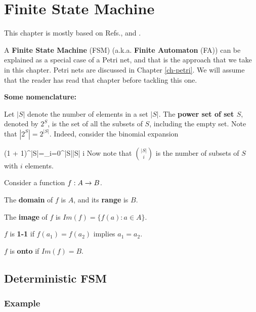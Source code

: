 \chapter{Finite State Machine}
\label{ch-finite-state}

This chapter is mostly based on Refs.\cite{fsm-brilliant}, \cite{wiki-det-automaton} and
\cite{wiki-nondet-automaton}.

A {\bf Finite State Machine} (FSM) (a.k.a. {\bf Finite Automaton} (FA))  can be explained as a 
special case of a Petri net, and that
is the approach that we take in this chapter.
Petri nets are discussed in Chapter \ref{ch-petri}. We will assume
that the reader has read that chapter before tackling this one.

{\bf Some nomenclature:}

Let $|S|$ denote the number of elements
in a set $|S|$.
The {\bf power set of set $S$}, denoted by $2^S$,
is the set of all the subsets of $S$, including the empty set.
Note that $|2^S|=2^{|S|}$. Indeed,
consider the binomial expansion

\beq
(1 + 1)^{|S|}=\sum_{i=0}^{|S|}{|S| \choose i}
\eeq
Now note that  ${|S|\choose i}$
is the number of subsets of $S$ with $i$ elements.

Consider a function
$f:A\rightarrow B$. 

The {\bf domain} of $f$ is $A$,
and its {\bf range} is $B$.

The {\bf image} of $f$
is $Im(f)=\{f(a): a\in A\}$. 

$f$ is {\bf 1-1} if $f(a_1)=f(a_2)$
implies $a_1=a_2$.


$f$ is {\bf onto} if $Im(f)=B$.

\section{Deterministic FSM}

\subsection{Example}

